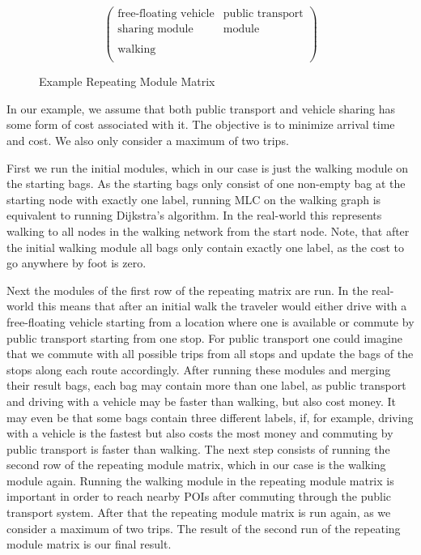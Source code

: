 \begin{figure}[ht]
\centering
\[
\begin{pmatrix}
\text{free-floating vehicle} & \text{public transport} \\
\text{sharing module} & \text{module} \\
\\
\text{walking} & \\
\end{pmatrix}
\]
\caption{Example Repeating Module Matrix}
\label{fig:example_module_matrix}
\end{figure}

In our example, we assume that both public transport and vehicle sharing has some form of cost associated with it.
The objective is to minimize arrival time and cost.
We also only consider a maximum of two trips.

First we run the initial modules, which in our case is just the walking module on the starting bags.
As the starting bags only consist of one non-empty bag at the starting node with exactly one label, running MLC on the walking graph is equivalent to running Dijkstra's algorithm.
In the real-world this represents walking to all nodes in the walking network from the start node.
Note, that after the initial walking module all bags only contain exactly one label, as the cost to go anywhere by foot is zero.

Next the modules of the first row of the repeating matrix are run.
In the real-world this means that after an initial walk the traveler would either drive with a free-floating vehicle starting from a location where one is available or commute by public transport starting from one stop.
For public transport one could imagine that we commute with all possible trips from all stops and update the bags of the stops along each route accordingly.
After running these modules and merging their result bags, each bag may contain more than one label, as public transport and driving with a vehicle may be faster than walking, but also cost money.
It may even be that some bags contain three different labels, if, for example, driving with a vehicle is the fastest but also costs the most money and commuting by public transport is faster than walking.
The next step consists of running the second row of the repeating module matrix, which in our case is the walking module again.
Running the walking module in the repeating module matrix is important in order to reach nearby POIs after commuting through the public transport system.
After that the repeating module matrix is run again, as we consider a maximum of two trips.
The result of the second run of the repeating module matrix is our final result.



